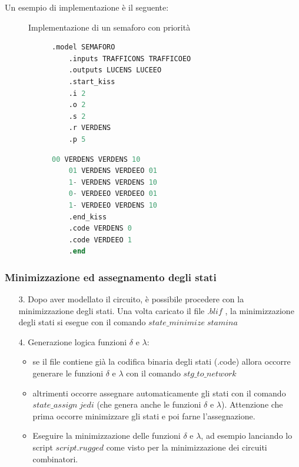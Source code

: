 \documentclass[a4paper]{article}
\theoremstyle{break}
\theoremstyle{break}
\theoremstyle{break}
\theoremstyle{break}
\begin{document}
Un esempio di implementazione è il seguente:

\begin{figure}[H]
  \begin{example}
    Implementazione di un semaforo con priorità
    \begin{figure}[H]
  \begin{lstlisting}[language=Verilog]
    .model SEMAFORO
    .inputs TRAFFICONS TRAFFICOEO
    .outputs LUCENS LUCEEO
    .start_kiss
    .i 2
    .o 2
    .s 2
    .r VERDENS
    .p 5
    \end{lstlisting}
  \end{figure}

  \begin{figure}[H]
  \begin{lstlisting}[language=Verilog]
    00 VERDENS VERDENS 10
    01 VERDENS VERDEEO 01
    1- VERDENS VERDENS 10
    0- VERDEEO VERDEEO 01
    1- VERDEEO VERDENS 10
    .end_kiss
    .code VERDENS 0
    .code VERDEEO 1
    .end
  \end{lstlisting}
\end{figure}
  \end{example}
\end{figure}

\subsubsection{Minimizzazione ed assegnamento degli stati}
\begin{enumerate}
  \item[3.] Dopo aver modellato il circuito, è possibile procedere con la
  minimizzazione degli stati. Una volta caricato il file \( .blif \) , la
  minimizzazione degli stati si esegue con il comando \( state\_minimize\;stamina \) 
\item [4.] Generazione logica funzioni \( \delta \) e \( \lambda \):
  \begin{itemize}
    \item se il file contiene già la codifica binaria degli stati (.code) allora
    occorre generare le funzioni \( \delta \) e \( \lambda \)  con il comando \( stg\_to\_network \)
    \item altrimenti occorre assegnare automaticamente gli stati con il comando
    \( state\_assign\;jedi \) (che genera anche le funzioni \( \delta \)  e \( \lambda \)).
    Attenzione che prima occorre minimizzare gli stati e poi farne l’assegnazione.
    \item Eseguire la minimizzazione delle funzioni \( \delta \) e \( \lambda \), ad esempio lanciando
    lo script \(script.rugged\) come visto per la minimizzazione dei circuiti
    combinatori.
  \end{itemize}

\end{enumerate}
\end{document}
